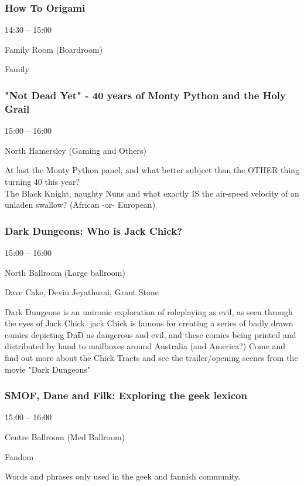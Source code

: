 \documentclass{scrreprt}
\begin{document}
\begin{multicols}{2}
\subsubsection*{How To Origami}\begin{description}
\setlength{\itemsep}{0pt}
\setlength{\parsep}{0pt}
\setlength{\parskip}{0pt}
\item[Time:]{14:30 -- 15:00}
\item[Venue:]{Family Room (Boardroom)}
\item[Tags:]{Family}\end{description}

\subsubsection*{"Not Dead Yet" - 40 years of Monty Python and the Holy Grail}\begin{description}
\setlength{\itemsep}{0pt}
\setlength{\parsep}{0pt}
\setlength{\parskip}{0pt}
\item[Time:]{15:00 -- 16:00}
\item[Venue:]{North Hamersley (Gaming and Others)}\end{description}
At last the Monty Python panel, and what better subject than the OTHER thing turning 40 this year? \\The Black Knight, naughty Nuns and what exactly IS the air-speed velocity of an unladen swallow? (African -or- European)
\subsubsection*{Dark Dungeons: Who is Jack Chick?}\begin{description}
\setlength{\itemsep}{0pt}
\setlength{\parsep}{0pt}
\setlength{\parskip}{0pt}
\item[Time:]{15:00 -- 16:00}
\item[Venue:]{North Ballroom (Large ballroom)}
\item[People:]{Dave Cake, Devin Jeyathurai, Grant Stone}\end{description}
Dark Dungeons is an unironic exploration of roleplaying as evil, as seen through the eyes of Jack Chick. jack Chick is famous for creating a series of badly drawn comics depicting DnD as dangerous and evil, and these comics being printed and distributed by hand to mailboxes around Australia (and America?) Come and find out more about the Chick Tracts and see the trailer/opening scenes from the movie "Dark Dungeons"
\subsubsection*{SMOF, Dane and Filk: Exploring the geek lexicon}\begin{description}
\setlength{\itemsep}{0pt}
\setlength{\parsep}{0pt}
\setlength{\parskip}{0pt}
\item[Time:]{15:00 -- 16:00}
\item[Venue:]{Centre Ballroom (Med Ballroom)}
\item[Tags:]{Fandom}\end{description}
Words and phrases only used in the geek and fannish community.

\end{multicols}
\end{document}
